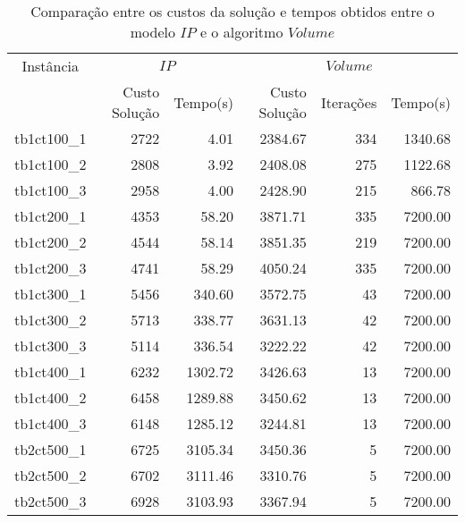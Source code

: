 \begin{table}[htbp]
\begin{center}
  \begin{tabular}{|c|r|r|r|r|r|}
    \hline
      Instância & \multicolumn{2}{|c|}{$IP$} & \multicolumn{3}{|c|}{$Volume$}\\
                & Custo Solução    & Tempo(s)  & Custo Solução &Iterações & Tempo(s)      \\ \hline
        tb1ct100\_1 & 2722 & 4.01 & 2384.67 & 334 & 1340.68 \\ \hline
        tb1ct100\_2 & 2808 & 3.92 & 2408.08 & 275 & 1122.68 \\ \hline
        tb1ct100\_3 & 2958 & 4.00 & 2428.90 & 215 & 866.78 \\ \hline
        tb1ct200\_1 & 4353 & 58.20 & 3871.71 & 335 & 7200.00 \\ \hline
        tb1ct200\_2 & 4544 & 58.14 & 3851.35 & 219 & 7200.00 \\ \hline
        tb1ct200\_3 & 4741 & 58.29 & 4050.24 & 335 & 7200.00 \\ \hline
        tb1ct300\_1 & 5456 & 340.60 & 3572.75 & 43 & 7200.00 \\ \hline
        tb1ct300\_2 & 5713 & 338.77 & 3631.13 & 42 & 7200.00 \\ \hline
        tb1ct300\_3 & 5114 & 336.54 & 3222.22 & 42 & 7200.00 \\ \hline
        tb1ct400\_1 & 6232 & 1302.72 & 3426.63 & 13 & 7200.00 \\ \hline
        tb1ct400\_2 & 6458 & 1289.88 & 3450.62 & 13 & 7200.00 \\ \hline
        tb1ct400\_3 & 6148 & 1285.12 & 3244.81 & 13 & 7200.00 \\ \hline
        tb2ct500\_1 & 6725 & 3105.34 & 3450.36 & 5 & 7200.00 \\ \hline
        tb2ct500\_2 & 6702 & 3111.46 & 3310.76 & 5 & 7200.00 \\ \hline
        tb2ct500\_3 & 6928 & 3103.93 & 3367.94 & 5 & 7200.00 \\ \hline
  \end{tabular}
\caption{Comparação entre os custos da solução e tempos obtidos entre o modelo $IP$ e o algoritmo $Volume$}
\label{table:resultados4e6}
\end{center}
\end{table}